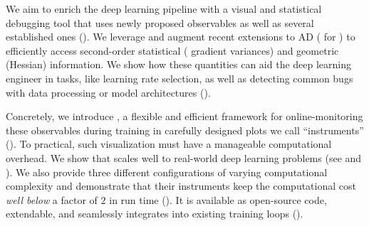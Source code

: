 We aim to enrich the deep learning pipeline with a visual and statistical
debugging tool that uses newly proposed observables as well as several
established ones (). We leverage and augment recent
extensions to AD (\ie \backpack \citep{dangel2020backpack} for
\pytorch \citep{paszke2019pytorch}) to efficiently access second-order statistical (\eg
gradient variances) and geometric (\eg Hessian) information. We show how these
quantities can aid the deep learning engineer in tasks, like learning rate
selection, as well as detecting common bugs with data processing or model
architectures ().

Concretely, we introduce \cockpit, a flexible and efficient framework for
online-monitoring these observables during training in carefully designed plots
we call ``instruments'' (). To practical, such
visualization must have a manageable computational overhead. We show that
\cockpit scales well to real-world deep learning problems (see
 and ). We also provide
three different configurations of varying computational complexity and
demonstrate that their instruments keep the computational cost \textit{well
  below} a factor of $2$ in run time (). It is
available as open-source code, extendable, and seamlessly integrates into
existing \pytorch training loops ().


